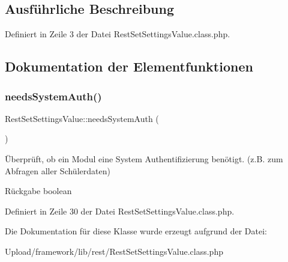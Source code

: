 \subsection{Ausführliche Beschreibung}


Definiert in Zeile 3 der Datei Rest\+Set\+Settings\+Value.\+class.\+php.



\subsection{Dokumentation der Elementfunktionen}
\mbox{\label{class_rest_set_settings_value_a8607df6fc01b30e9915e64e4191259d6}} 
\subsubsection{\texorpdfstring{needs\+System\+Auth()}{needsSystemAuth()}}
{\footnotesize\ttfamily Rest\+Set\+Settings\+Value\+::needs\+System\+Auth (\begin{DoxyParamCaption}{ }\end{DoxyParamCaption})}

Überprüft, ob ein Modul eine System Authentifizierung benötigt. (z.\+B. zum Abfragen aller Schülerdaten) \begin{DoxyReturn}{Rückgabe}
boolean 
\end{DoxyReturn}


Definiert in Zeile 30 der Datei Rest\+Set\+Settings\+Value.\+class.\+php.



Die Dokumentation für diese Klasse wurde erzeugt aufgrund der Datei\+:\begin{DoxyCompactItemize}
\item 
Upload/framework/lib/rest/Rest\+Set\+Settings\+Value.\+class.\+php\end{DoxyCompactItemize}
